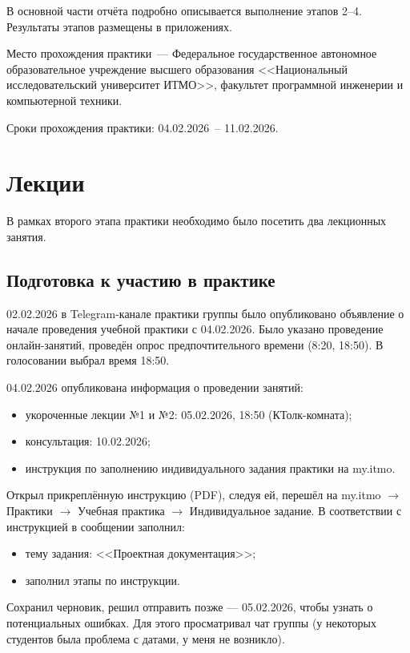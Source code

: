\documentclass[a4paper,14pt]{extarticle}
\begin{document}
В основной части отчёта подробно описывается выполнение этапов 2--4. Результаты этапов размещены в приложениях.

Место прохождения практики~--- Федеральное государственное автономное образовательное учреждение высшего образования <<Национальный исследовательский университет ИТМО>>, факультет программной инженерии и компьютерной техники.

Сроки прохождения практики: 04.02.2026~-- 11.02.2026.

\newpage

\section{Лекции}

В рамках второго этапа практики необходимо было посетить два лекционных занятия.

\subsection{Подготовка к участию в практике}

02.02.2026 в Telegram-канале практики группы было опубликовано объявление о начале проведения учебной практики с 04.02.2026. Было указано проведение онлайн-занятий, проведён опрос предпочтительного времени (8:20, 18:50). В голосовании выбрал время 18:50.

04.02.2026 опубликована информация о проведении занятий:
\begin{itemize}
  \item укороченные лекции №1 и №2: 05.02.2026, 18:50 (КТолк-комната);
  \item консультация: 10.02.2026;
  \item инструкция по заполнению индивидуального задания практики на my.itmo.
\end{itemize}

Открыл прикреплённую инструкцию (PDF), следуя ей, перешёл на my.itmo $\rightarrow$ Практики $\rightarrow$ Учебная практика $\rightarrow$ Индивидуальное задание. В соответствии с инструкцией в сообщении заполнил:
\begin{itemize}
  \item тему задания: <<Проектная документация>>;
  \item заполнил этапы по инструкции.
\end{itemize}

Сохранил черновик, решил отправить позже --- 05.02.2026, чтобы узнать о потенциальных ошибках. Для этого просматривал чат группы (у некоторых студентов была проблема с датами, у меня не возникло).
\end{document}
